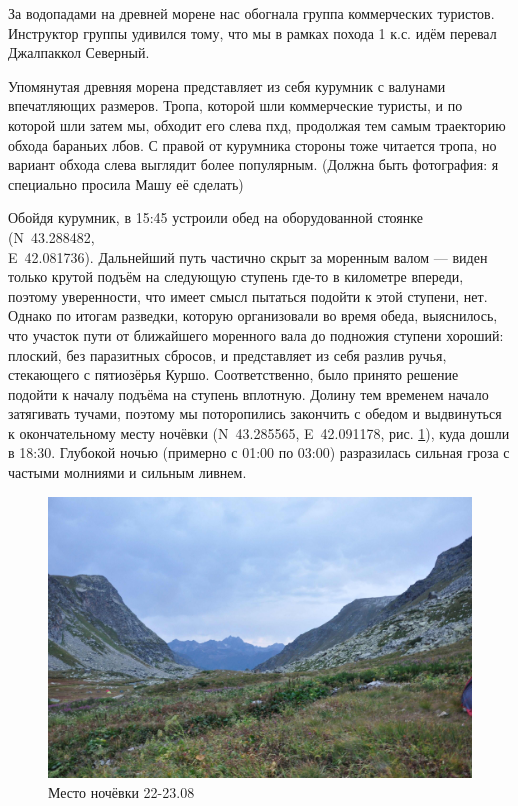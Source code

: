 За водопадами на древней морене нас обогнала группа коммерческих туристов. Инструктор группы удивился тому, что мы в рамках похода 1 к.с. идём перевал Джалпаккол Северный. 

Упомянутая древняя морена представляет из себя курумник с валунами впечатляющих размеров. Тропа, которой шли коммерческие туристы, и по которой шли затем мы, обходит его слева пхд, продолжая тем самым траекторию обхода бараньих лбов. С правой от курумника стороны тоже читается тропа, но вариант обхода слева выглядит более популярным. \alert{(Должна быть фотография: я специально просила Машу её сделать)}

Обойдя курумник, в 15:45 устроили обед на оборудованной стоянке (N~43.288482\degree,\\E~42.081736\degree). Дальнейший путь частично скрыт за моренным валом --- виден только крутой подъём на следующую ступень где-то в километре впереди, поэтому уверенности, что имеет смысл пытаться подойти к этой ступени, нет. Однако по итогам разведки, которую организовали во время обеда, выяснилось, что участок пути от ближайшего моренного вала до подножия ступени хороший: плоский, без паразитных сбросов, и представляет из себя разлив ручья, стекающего с пятиозёрья Куршо. Соответственно, было принято решение подойти к началу подъёма на ступень вплотную. Долину тем временем начало затягивать тучами, поэтому мы поторопились закончить с обедом и выдвинуться к окончательному месту ночёвки (N~43.285565\degree, E~42.091178\degree, рис. \ref{fig:DSC_0018}), куда дошли в 18:30. Глубокой ночью (примерно с 01:00 по 03:00) разразилась сильная гроза с частыми молниями и сильным ливнем.

\begin{figure}[h!]
	\centering
	\includegraphics[width=0.7\linewidth]{../pics/DSC_0018}
	\caption{Место ночёвки 22-23.08}
	\label{fig:DSC_0018}
\end{figure}

\clearpage